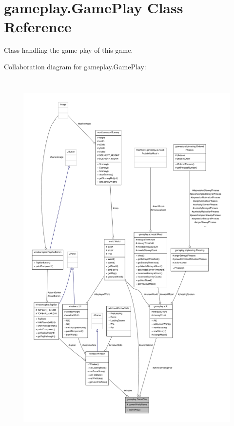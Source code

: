 \hypertarget{classgameplay_1_1_game_play}{\section{gameplay.\-Game\-Play Class Reference}
\label{classgameplay_1_1_game_play}
}


Class handling the game play of this game.  




Collaboration diagram for gameplay.\-Game\-Play\-:\nopagebreak
\begin{figure}[H]
\begin{center}
\leavevmode
\includegraphics[height=550pt]{classgameplay_1_1_game_play__coll__graph}
\end{center}
\end{figure}
